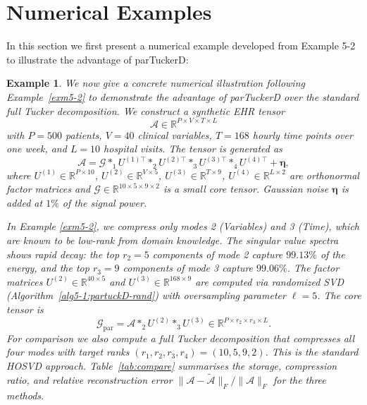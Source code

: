 \documentclass[11pt, oneside]{article}  %
\newtheorem{exm}[thm]{Example}
\newcommand{\bld}[1]{\mathbf{#1}}
\newcommand{\RR}{\mathbb{R}}
\newcommand{\A}{\mathcal{A}}
\newcommand{\caG}{\mathcal{G}}
\begin{document}
\vskip 5pt
\section{Numerical Examples}
\label{sec6}
\setcounter{equation}{0} 

In this section we first present a numerical example developed from Example 5-2 to illustrate the advantage of parTuckerD: 

\begin{exm}\label{exm6-1:partuck}
We now give a concrete numerical illustration following Example~\ref{exm5-2} to demonstrate the advantage of parTuckerD over the standard 
full Tucker decomposition.  We construct a synthetic EHR tensor 
\[
\A \in \RR^{P \times V \times T \times L}
\]
with $P=500$ patients, $V=40$ clinical variables, $T=168$ hourly time points over one week, and $L=10$ hospital visits.  The tensor is generated
as
\[
\A = \caG \ast_1 U^{(1)\top} \ast_2 U^{(2)\top} \ast_3 U^{(3)\top} \ast_4 U^{(4)\top} + \bld{\eta},
\]
where $U^{(1)}\in\RR^{P\times 10}$, $U^{(2)}\in\RR^{V\times 5}$, $U^{(3)}\in\RR^{T\times 9}$, $U^{(4)}\in\RR^{L\times 2}$ are 
orthonormal factor matrices and $\caG\in\RR^{10\times 5\times 9\times 2}$ is a small core tensor.  Gaussian noise $\bld{\eta}$ is added at 
$1\%$ of the signal power.

In Example \ref{exm5-2}, we compress only modes 2 (Variables) and 3 (Time), which are known to be low-rank from domain knowledge.  The 
singular value spectra shows rapid decay: the top $r_2=5$ components of mode 2 capture $99.13\%$ of the energy, and the top $r_3=9$  
components of mode 3 capture $99.06\%$.  The factor matrices $U^{(2)}\in\RR^{40\times 5}$ and $U^{(3)}\in\RR^{168\times 9}$ are 
computed via randomized SVD (Algorithm~\ref{alg5-1:partuckD-rand}) with oversampling parameter $\ell=5$.  The core tensor is
\[
\caG_{\text{par}} = \A\ast_2 U^{(2)} \ast_3 U^{(3)} \in \RR^{P \times r_2 \times r_3 \times L}.
\]
For comparison we also compute a full Tucker decomposition that compresses all four modes with target ranks $(r_1,r_2,r_3,r_4)=(10,5,9,2)$.  
This is the standard HOSVD approach.  Table~\ref{tab:compare} summarises the storage, compression ratio, and relative reconstruction error 
$\|\A-\widetilde{\A}\|_F/\|\A\|_F$ for the three methods.


\end{exm}
\end{document}
